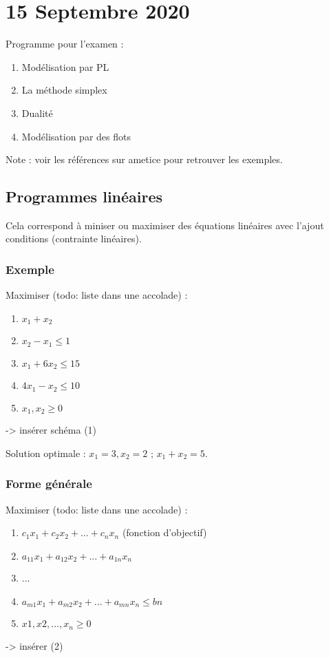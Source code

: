 \section{15 Septembre 2020}

Programme pour l'examen :

\begin{enumerate}
\tightlist
\item Modélisation par PL
\item La méthode simplex
\item Dualité
\item Modélisation par des flots
\end{enumerate}

Note : voir les références sur ametice pour retrouver les exemples.

\subsection{Programmes linéaires}

Cela correspond à miniser ou maximiser des équations linéaires avec l'ajout conditions (contrainte linéaires).

\subsubsection{Exemple}

Maximiser (todo: liste dans une accolade) :

\begin{enumerate}
\tightlist
\item $x_1+x_2$
\item $x_2-x_1 \leqslant 1$
\item $x_1+6x_2 \leqslant 15$
\item $4x_1-x_2 \leqslant 10$
\item $x_1,x_2 \geqslant 0$
\end{enumerate}

-> insérer schéma (1)

Solution optimale : $x_1 = 3, x_2 = 2$ ; $x_1 + x_2 = 5$.

\subsubsection{Forme générale}

Maximiser (todo: liste dans une accolade) :

\begin{enumerate}
\tightlist
\item $c_1x_1+c_2x_2+...+c_nx_n$ (fonction d'objectif)
\item $a_{11}x_1+a_{12}x_2 + ... + a_{1n}x_n$
\item ...
\item $a_{m1}x_1+a_{m2}x_2+...+a_{mn}x_n \leqslant bn$
\item $x1,x2,...,x_n \geqslant 0$
\end{enumerate}

-> insérer (2)

